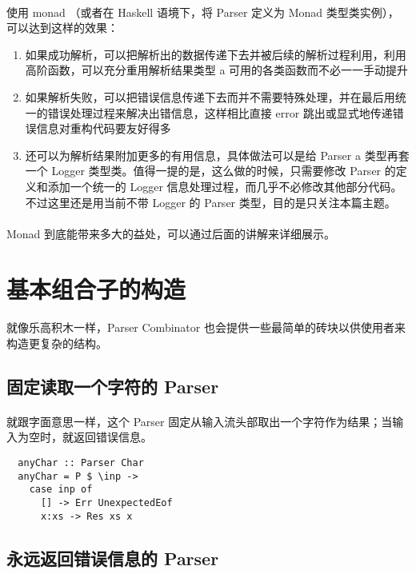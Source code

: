 \documentclass{article}
\begin{document}
  \paragraph{}
   使用 monad （或者在 Haskell 语境下，将 Parser 定义为 Monad 类型类实例），可以达到这样的效果：
   \begin{enumerate}
	\item 如果成功解析，可以把解析出的数据传递下去并被后续的解析过程利用，利用高阶函数，可以充分重用解析结果类型 a 可用的各类函数而不必一一手动提升
	\item 如果解析失败，可以把错误信息传递下去而并不需要特殊处理，并在最后用统一的错误处理过程来解决出错信息，这样相比直接 error 跳出或显式地传递错误信息对重构代码要友好得多
	\item 还可以为解析结果附加更多的有用信息，具体做法可以是给 Parser a 类型再套一个 Logger 类型类。值得一提的是，这么做的时候，只需要修改 Parser 的定义和添加一个统一的 Logger 信息处理过程，而几乎不必修改其他部分代码。不过这里还是用当前不带 Logger 的 Parser 类型，目的是只关注本篇主题。
   \end{enumerate}	
  \paragraph{}
   Monad 到底能带来多大的益处，可以通过后面的讲解来详细展示。

\section{基本组合子的构造}
  \paragraph{}
   就像乐高积木一样，Parser Combinator 也会提供一些最简单的砖块以供使用者来构造更复杂的结构。
 \subsection{固定读取一个字符的 Parser}
  \paragraph{}
   就跟字面意思一样，这个 Parser 固定从输入流头部取出一个字符作为结果；当输入为空时，就返回错误信息。
  \begin{lstlisting}
  anyChar :: Parser Char
  anyChar = P $ \inp ->
    case inp of
      [] -> Err UnexpectedEof
      x:xs -> Res xs x
  \end{lstlisting}
 \subsection{永远返回错误信息的 Parser}
\end{document}
